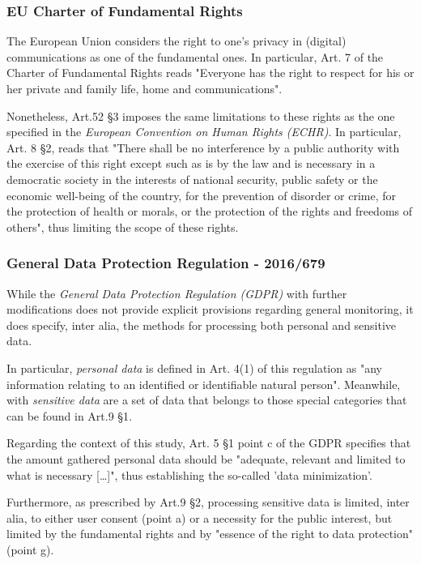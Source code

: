 \subsubsection{EU Charter of Fundamental Rights}

The European Union considers the right to one's privacy in (digital) communications as one of the fundamental ones. In particular, Art. 7 of the Charter of Fundamental Rights reads "Everyone has the right to respect for his or her private and family life, home and communications"\cite{eu_charter_fundamental_rights}. 

Nonetheless, Art.52 \S 3 imposes the same limitations to these rights as the one specified in the \textit{European Convention on Human Rights (ECHR)}\cite{eu_charter_fundamental_rights}. In particular, Art. 8 \S 2, reads that "There shall be no interference by a public authority with the exercise of this right except such as is by the law and is necessary in a democratic society in the interests of national security, public safety or the economic well-being of the country, for the prevention of disorder or crime, for the protection of health or morals, or the protection of the rights and freedoms of others"\cite{echr}, thus limiting the scope of these rights.

\subsubsection{General Data Protection Regulation - 2016/679}

While the \textit{General Data Protection Regulation (GDPR)} with further modifications does not provide explicit provisions regarding general monitoring, it does specify, inter alia, the methods for processing both personal and sensitive data.

In particular, \textit{personal data} is defined in Art. 4(1) of this regulation \cite{GDPR} as "any information relating to an identified or identifiable natural person". Meanwhile, with \textit{sensitive data} are a set of data that belongs to those special categories that can be found in Art.9 \S 1\cite{GDPR}.

Regarding the context of this study, Art. 5 \S 1 point c of the GDPR\cite{GDPR} specifies that the amount gathered personal data should be "adequate, relevant and limited to what is necessary [\dots]", thus establishing the so-called 'data minimization'.

Furthermore, as prescribed by Art.9 \S 2, processing sensitive data is limited, inter alia, to either user consent (point a) or a necessity for the public interest, but limited by the fundamental rights and by "essence of the right to data protection"\cite{GDPR} (point g).

